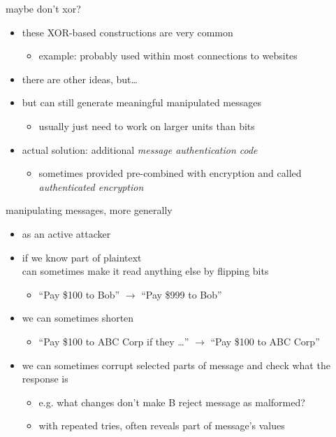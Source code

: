 \begin{frame}{maybe don't xor?}
    \begin{itemize}
    \item these XOR-based constructions are very common 
        \begin{itemize}
        \item example: probably used within most connections to websites
        \end{itemize}
    \item there are other ideas, but\ldots
    \item but can still generate meaningful manipulated messages
        \begin{itemize}
        \item usually just need to work on larger units than bits
        \end{itemize}
    \vspace{.5cm}
    \item actual solution: additional \textit{message authentication code}
        \begin{itemize}
        \item sometimes provided pre-combined with encryption and called \textit{authenticated encryption}
        \end{itemize}
    \end{itemize}
\end{frame}

\begin{frame}{manipulating messages, more generally}
\begin{itemize}
\item as an active attacker
\vspace{.5cm}
\item if we know part of plaintext \\
    can sometimes make it read anything else by flipping bits
    \begin{itemize}
    \item ``Pay \$100 to Bob'' $\rightarrow$ ``Pay \$999 to Bob''
    \end{itemize}
\item we can sometimes shorten 
    \begin{itemize}
    \item ``Pay \$100 to ABC Corp if they \ldots'' $\rightarrow$ ``Pay \$100 to ABC Corp''
    \end{itemize}
\item we can sometimes corrupt selected parts of message and check what the response is
    \begin{itemize}
    \item e.g. what changes don't make B reject message as malformed?
    \item with repeated tries, often reveals part of message's values
    \end{itemize}
\end{itemize}
\end{frame}
